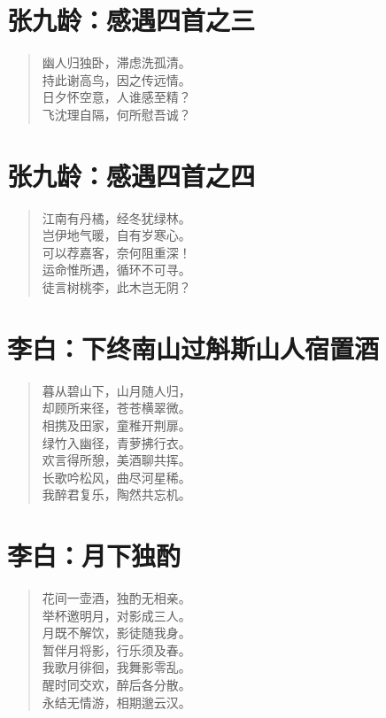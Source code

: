 \documentclass[12pt,oneside]{book}
\newenvironment{shici}{
\begin{verse}
\centering\large\hspace{12pt}}
{\end{verse}}
\begin{document}
\chapter{张九龄：感遇四首之三}
\begin{shici}
幽人归独卧，滞虑洗孤清。\\
持此谢高鸟，因之传远情。\\
日夕怀空意，人谁感至精？\\
飞沈理自隔，何所慰吾诚？
\end{shici}

\chapter{张九龄：感遇四首之四}
\begin{shici}
江南有丹橘，经冬犹绿林。\\
岂伊地气暖，自有岁寒心。\\
可以荐嘉客，奈何阻重深！\\
运命惟所遇，循环不可寻。\\
徒言树桃李，此木岂无阴？
\end{shici}

\chapter{李白：下终南山过斛斯山人宿置酒}
\begin{shici}
暮从碧山下，山月随人归，\\
却顾所来径，苍苍横翠微。\\
相携及田家，童稚开荆扉。\\
绿竹入幽径，青萝拂行衣。\\
欢言得所憩，美酒聊共挥。\\
长歌吟松风，曲尽河星稀。\\
我醉君复乐，陶然共忘机。
\end{shici}

\chapter{李白：月下独酌}
\begin{shici}
花间一壶酒，独酌无相亲。\\
举杯邀明月，对影成三人。\\
月既不解饮，影徒随我身。\\
暂伴月将影，行乐须及春。\\
我歌月徘徊，我舞影零乱。\\
醒时同交欢，醉后各分散。\\
永结无情游，相期邈云汉。
\end{shici}
\end{document}
